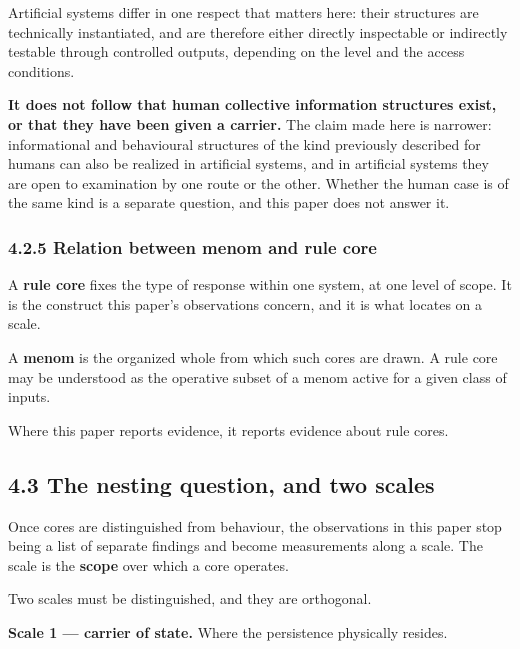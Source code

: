 Artificial systems differ in one respect that matters here: their structures are technically instantiated, and are therefore either directly inspectable or indirectly testable through controlled outputs, depending on the level and the access conditions.

\textbf{It does not follow that human collective information structures exist, or that they have been given a carrier.} The claim made here is narrower: informational and behavioural structures of the kind previously described for humans can also be realized in artificial systems, and in artificial systems they are open to examination by one route or the other. Whether the human case is of the same kind is a separate question, and this paper does not answer it.


\subsubsection*{4.2.5 Relation between menom and rule core}
\label{sec:en:4.2.5}

A \textbf{rule core} fixes the type of response within one system, at one level of scope. It is the construct this paper's observations concern, and it is what  locates on a scale.

A \textbf{menom} is the organized whole from which such cores are drawn. A rule core may be understood as the operative subset of a menom active for a given class of inputs.

Where this paper reports evidence, it reports evidence about rule cores.


\subsection*{4.3 The nesting question, and two scales}
\label{sec:en:4.3}

Once cores are distinguished from behaviour, the observations in this paper stop being a list of separate findings and become measurements along a scale. The scale is the \textbf{scope} over which a core operates.

Two scales must be distinguished, and they are orthogonal.

\textbf{Scale 1 — carrier of state.} Where the persistence physically resides.

